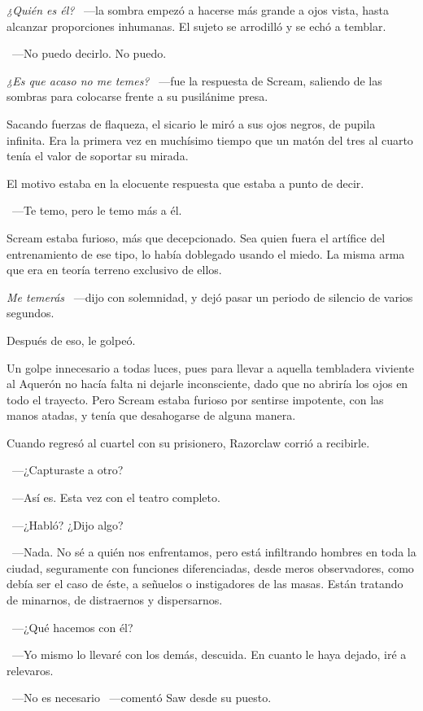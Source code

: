 \emph{¿Quién es él?} ~---la sombra empezó a hacerse más grande a ojos vista, hasta alcanzar proporciones inhumanas. El sujeto se arrodilló y se echó a temblar.

~---No puedo decirlo. No puedo.

\emph{¿Es que acaso no me temes?} ~---fue la respuesta de Scream, saliendo de las sombras para colocarse frente a su pusilánime presa.

Sacando fuerzas de flaqueza, el sicario le miró a sus ojos negros, de pupila infinita. Era la primera vez en muchísimo tiempo que un matón del tres al cuarto tenía el valor de soportar su mirada.

El motivo estaba en la elocuente respuesta que estaba a punto de decir.

~---Te temo, pero le temo más a él.

Scream estaba furioso, más que decepcionado. Sea quien fuera el artífice del entrenamiento de ese tipo, lo había doblegado usando el miedo. La misma arma que era en teoría terreno exclusivo de ellos.

\emph{Me temerás} ~---dijo con solemnidad, y dejó pasar un periodo de silencio de varios segundos.

Después de eso, le golpeó.

Un golpe innecesario a todas luces, pues para llevar a aquella tembladera viviente al Aquerón no hacía falta ni dejarle inconsciente, dado que no abriría los ojos en todo el trayecto. Pero Scream estaba furioso por sentirse impotente, con las manos atadas, y tenía que desahogarse de alguna manera.

Cuando regresó al cuartel con su prisionero, Razorclaw corrió a recibirle.

~---¿Capturaste a otro?

~---Así es. Esta vez con el teatro completo.

~---¿Habló? ¿Dijo algo?

~---Nada. No sé a quién nos enfrentamos, pero está infiltrando hombres en toda la ciudad, seguramente con funciones diferenciadas, desde meros observadores, como debía ser el caso de éste, a señuelos o instigadores de las masas. Están tratando de minarnos, de distraernos y dispersarnos.

~---¿Qué hacemos con él?

~---Yo mismo lo llevaré con los demás, descuida. En cuanto le haya dejado, iré a relevaros.

~---No es necesario ~---comentó Saw desde su puesto.

